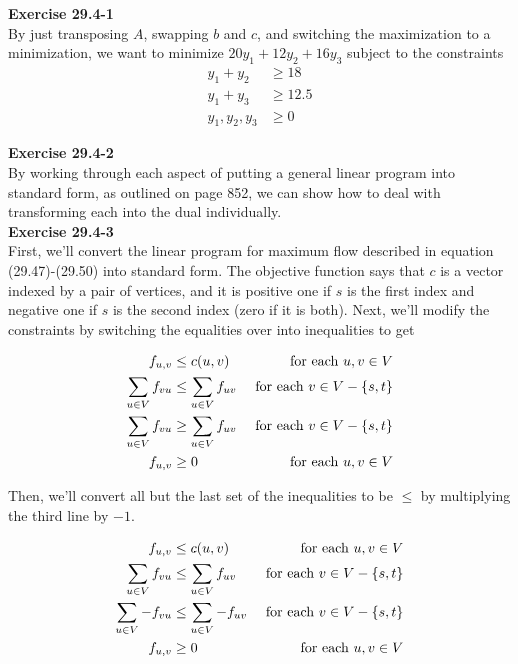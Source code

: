 \documentclass{article}
\begin{document}
\noindent\textbf{Exercise 29.4-1}\\

By just transposing $A$, swapping $b$ and $c$, and switching the maximization to a minimization, we want to minimize $20y_1 + 12 y_2 + 16 y_3$ subject to the constraints 
\begin{align*}
y_1 + y_2 &\ge 18\\
y_1 + y_3 &\ge 12.5\\
y_1,y_2,y_3 &\ge 0
\end{align*}

\noindent\textbf{Exercise 29.4-2}\\

By working through each aspect of putting a general linear program into standard form, as outlined on page 852, we can show how to deal with transforming each into the dual individually.  \\

\noindent\textbf{Exercise 29.4-3}\\


First, we'll convert the linear program for maximum flow described in equation (29.47)-(29.50) into standard form. The objective function says that $c$ is a vector indexed by a pair of vertices, and it is positive one if $s$ is the first index and negative one if $s$ is the second index (zero if it is both). Next, we'll modify the constraints by switching the equalities over into inequalities to get

\begin{align*}
f_{u,v} &\le c(u,v) &\hbox{ for each $u,v\in V$}\\
\sum_{u\in V} f_{vu} &\le \sum_{u\in V} f_{uv}  &\hbox{ for each $v\in V - \{s,t\}$}\\
\sum_{u\in V} f_{vu} &\ge \sum_{u\in V} f_{uv}  &\hbox{ for each $v\in V - \{s,t\}$}\\
f_{u,v} &\ge 0 &\hbox{ for each $u,v\in V$}\\
\end{align*}

Then, we'll convert all but the last set of the inequalities to be $\le$ by multiplying the third line by $-1$.

\begin{align*}
f_{u,v} &\le c(u,v) &\hbox{ for each $u,v\in V$}\\
\sum_{u\in V} f_{vu} &\le \sum_{u\in V} f_{uv}  &\hbox{ for each $v\in V - \{s,t\}$}\\
\sum_{u\in V} -f_{vu} &\le \sum_{u\in V} -f_{uv}  &\hbox{ for each $v\in V - \{s,t\}$}\\
f_{u,v} &\ge 0 &\hbox{ for each $u,v\in V$}\\
\end{align*}
\end{document}
